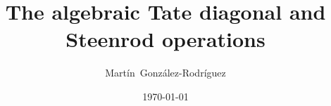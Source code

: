\documentclass{amsart}
\title{The algebraic Tate diagonal and Steenrod operations}
\author{Martín~González-Rodríguez}
\date{\today}
\begin{document}
	
	\maketitle
	\tableofcontents
	
	
	
	
	
	
	\newpage
	\appendix
	
	
	
	
	\sloppy
	\printbibliography
	\todos
\end{document}
